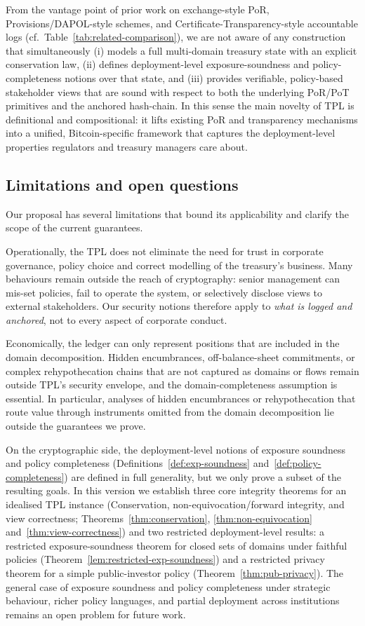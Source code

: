 \documentclass[11pt]{article}
\begin{document}
From the vantage point of prior work on exchange-style PoR, Provisions/DAPOL-style schemes, and
Certificate-Transparency-style accountable logs (cf.~Table~\ref{tab:related-comparison}), we are not
aware of any construction that simultaneously
(i) models a full multi-domain treasury state with an explicit conservation law,
(ii) defines deployment-level exposure-soundness and policy-completeness notions over that state, and
(iii) provides verifiable, policy-based stakeholder views that are sound with respect to both the
underlying PoR/PoT primitives and the anchored hash-chain.
In this sense the main novelty of TPL is definitional and compositional: it lifts existing PoR and
transparency mechanisms into a unified, Bitcoin-specific framework that captures the deployment-level
properties regulators and treasury managers care about.
\subsection{Limitations and open questions}

Our proposal has several limitations that bound its applicability and clarify the scope of the current guarantees.

Operationally, the TPL does not eliminate the need for trust in corporate governance, policy choice and
correct modelling of the treasury's business.
Many behaviours remain outside the reach of cryptography: senior management can mis-set policies,
fail to operate the system, or selectively disclose views to external stakeholders.
Our security notions therefore apply to \emph{what is logged and anchored}, not to every aspect of
corporate conduct.

Economically, the ledger can only represent positions that are included in the domain decomposition.
Hidden encumbrances, off-balance-sheet commitments, or complex rehypothecation chains that are not
captured as domains or flows remain outside TPL's security envelope, and the domain-completeness
assumption is essential.
In particular, analyses of hidden encumbrances or rehypothecation that route value through instruments
omitted from the domain decomposition lie outside the guarantees we prove.

On the cryptographic side, the deployment-level notions of exposure soundness and policy completeness
(Definitions~\ref{def:exp-soundness} and~\ref{def:policy-completeness}) are defined in full generality,
but we only prove a subset of the resulting goals.
In this version we establish three core integrity theorems for an idealised TPL instance
(Conservation, non-equivocation/forward integrity, and view correctness; Theorems~\ref{thm:conservation},
\ref{thm:non-equivocation} and~\ref{thm:view-correctness}) and two restricted deployment-level
results: a restricted exposure-soundness theorem for closed sets of domains under faithful policies
(Theorem~\ref{lem:restricted-exp-soundness}) and a restricted privacy theorem for a simple public-investor
policy (Theorem~\ref{thm:pub-privacy}).
The general case of exposure soundness and policy completeness under strategic behaviour, richer policy
languages, and partial deployment across institutions remains an open problem for future work.
\end{document}
